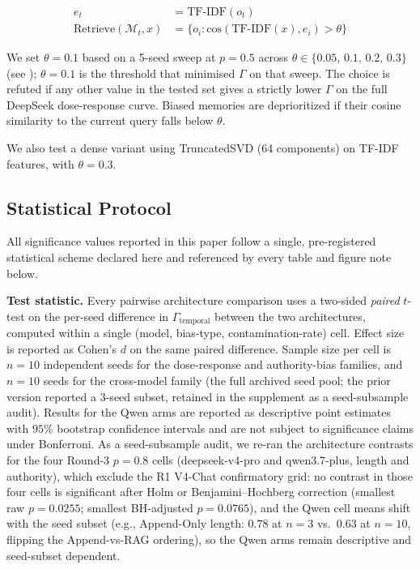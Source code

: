 \documentclass[11pt]{article}
\begin{document}
\begin{align}
e_t &= \text{TF-IDF}(o_t) \\
\text{Retrieve}(\mathcal{M}_t, x) &= \{o_i : \text{cos}(\text{TF-IDF}(x), e_i) > \theta\}
\end{align}

We set $\theta = 0.1$ based on a 5-seed sweep at $p=0.5$ across $\theta \in \{0.05,\,0.1,\,0.2,\,0.3\}$ (see ); $\theta = 0.1$ is the threshold that minimised $\Gamma$ on that sweep. The choice is refuted if any other value in the tested set gives a strictly lower $\Gamma$ on the full DeepSeek dose-response curve. Biased memories are deprioritized if their cosine similarity to the current query falls below $\theta$.

We also test a dense variant using TruncatedSVD (64 components) on TF-IDF features, with $\theta = 0.3$.


\subsection{Statistical Protocol}
\label{sec:stat-protocol}

All significance values reported in this paper follow a single, pre-registered statistical scheme declared here and referenced by every table and figure note below.

\textbf{Test statistic.} Every pairwise architecture comparison uses a two-sided \emph{paired} $t$-test on the per-seed difference in $\Gamma_{\text{temporal}}$ between the two architectures, computed within a single (model, bias-type, contamination-rate) cell. Effect size is reported as Cohen's $d$ on the same paired difference. Sample size per cell is $n=10$ independent seeds for the dose-response and authority-bias families, and $n=10$ seeds for the cross-model family (the full archived seed pool; the prior version reported a $3$-seed subset, retained in the supplement as a seed-subsample audit). Results for the Qwen arms are reported as descriptive point estimates with $95\%$ bootstrap confidence intervals and are not subject to significance claims under Bonferroni. As a seed-subsample audit, we re-ran the architecture contrasts for the four Round-3 $p{=}0.8$ cells (deepseek-v4-pro and qwen3.7-plus, length and authority), which exclude the R1 V4-Chat confirmatory grid: no contrast in those four cells is significant after Holm or Benjamini--Hochberg correction (smallest raw $p = 0.0255$; smallest BH-adjusted $p = 0.0765$), and the Qwen cell means shift with the seed subset (e.g., Append-Only length: $0.78$ at $n{=}3$ vs.\ $0.63$ at $n{=}10$, flipping the Append-vs-RAG ordering), so the Qwen arms remain descriptive and seed-subset dependent.
\end{document}
